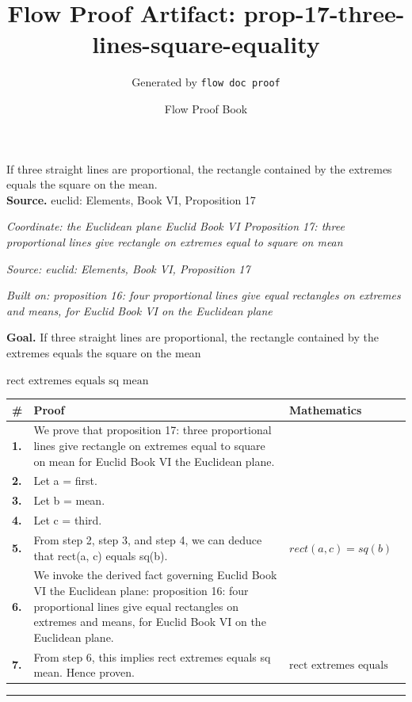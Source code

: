 \documentclass[11pt]{article}
\title{Flow Proof Artifact: prop-17-three-lines-square-equality}
\author{Generated by \texttt{flow doc proof}}
\date{Flow Proof Book}
\theoremstyle{definition}
\begin{document}
\maketitle
If three straight lines are proportional, the rectangle contained by the extremes equals the square on the mean.\\[0.5em]
\textbf{Source.} euclid: Elements, Book VI, Proposition 17\\[0.5em]
\bigskip
{}\par
\smallskip\noindent\textit{Coordinate: the Euclidean plane \cdot Euclid Book VI \cdot Proposition 17: three proportional lines give rectangle on extremes equal to square on mean}\par
\smallskip\noindent\textit{Source: euclid: Elements, Book VI, Proposition 17}\par
\smallskip\noindent\textit{Built on: proposition 16: four proportional lines give equal rectangles on extremes and means, for Euclid Book VI on the Euclidean plane}\par
\medskip
\noindent\textbf{Goal.} If three straight lines are proportional, the rectangle contained by the extremes equals the square on the mean\par
\noindent$\displaystyle \text{rect extremes equals sq mean}$\par
\medskip
\noindent
\begin{tabular}{@{} >{\raggedright\arraybackslash}p{} >{\raggedright\arraybackslash}p{} >{\raggedleft\arraybackslash}p{} @{}}
\textbf{\#} & \textbf{Proof} & \textbf{Mathematics} \\
\midrule
\textbf{1.} & We prove that proposition 17: three proportional lines give rectangle on extremes equal to square on mean for Euclid Book VI the Euclidean plane. & \\[0.45em]
\textbf{2.} & Let a = first. & \\[0.45em]
\textbf{3.} & Let b = mean. & \\[0.45em]
\textbf{4.} & Let c = third. & \\[0.45em]
\textbf{5.} & From step 2, step 3, and step 4, we can deduce that rect(a, c) equals sq(b). & $\displaystyle rect(a, c) = sq(b)$ \\[0.45em]
\textbf{6.} & We invoke the derived fact governing Euclid Book VI the Euclidean plane: proposition 16: four proportional lines give equal rectangles on extremes and means, for Euclid Book VI on the Euclidean plane. & \\[0.45em]
\textbf{7.} & From step 6, this implies rect extremes equals sq mean. Hence proven. & $\displaystyle \text{rect extremes equals sq mean}$ \\[0.45em]
\bottomrule
\end{tabular}
\label{thm:Geometry-Euclid Book VI-proposition_17_three_proportional_lines_give_rectangle_on_extremes_equal_to_square_on_mean}
\par\medskip\hrule
\end{document}
